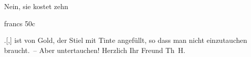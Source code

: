 \pstart
           Nein, sie kostet zehn \begin{otherlanguage}{french}francs 50c\end{otherlanguage}.{[},{]} ist von
                  Gold, der Stiel mit Tinte angefüllt, so dass man nicht einzutauchen braucht. –
                  Aber untertauchen!\pend
           \pstart Herzlich Ihr Freund \spacefill\mbox{Th H.}\pend{}\endnumbering{}
\begin{anhang}
\end{anhang}\newcommand{\dateiname}{L03849}\newcommand{\titel}{Theodor Herzl an Arthur Schnitzler, 18. 2. 1895}\newcommand{\editorInnen}{Selma Jahnke und Martin Anton Müller}
